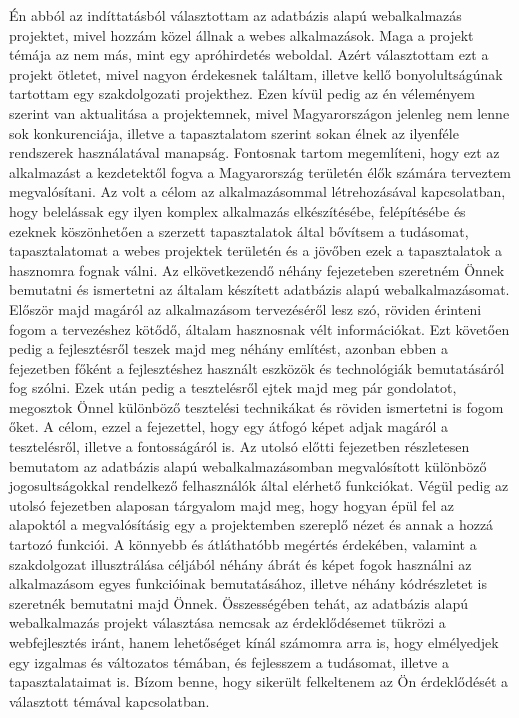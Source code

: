\documentclass[]{thesis-ekf}
\theoremstyle{definition}
\theoremstyle{remark}
\begin{document}
	Én abból az indíttatásból választottam az adatbázis alapú webalkalmazás projektet, mivel hozzám közel állnak a webes alkalmazások. Maga a projekt témája az nem más, mint egy apróhirdetés weboldal. Azért választottam ezt a projekt ötletet, mivel nagyon érdekesnek találtam, illetve kellő bonyolultságúnak tartottam egy szakdolgozati projekthez. Ezen kívül pedig az én véleményem szerint van aktualitása a projektemnek, mivel Magyarországon jelenleg nem lenne sok konkurenciája, illetve a tapasztalatom szerint sokan élnek az ilyenféle rendszerek használatával manapság. Fontosnak tartom megemlíteni, hogy ezt az alkalmazást a kezdetektől fogva a Magyarország területén élők számára terveztem megvalósítani. Az volt a célom az alkalmazásommal létrehozásával kapcsolatban, hogy belelássak egy ilyen komplex alkalmazás elkészítésébe, felépítésébe és ezeknek köszönhetően a szerzett tapasztalatok által bővítsem a tudásomat, tapasztalatomat a webes projektek területén és a jövőben ezek a tapasztalatok a hasznomra fognak válni. Az elkövetkezendő néhány fejezeteben szeretném Önnek bemutatni és ismertetni az általam készített adatbázis alapú webalkalmazásomat. Először majd magáról az alkalmazásom tervezéséről lesz szó, röviden érinteni fogom a tervezéshez kötődő, általam hasznosnak vélt információkat. Ezt követően pedig a fejlesztésről teszek majd meg néhány említést, azonban ebben a fejezetben főként a fejlesztéshez használt eszközök és technológiák bemutatásáról fog szólni. Ezek után pedig a tesztelésről ejtek majd meg pár gondolatot, megosztok Önnel különböző tesztelési technikákat és röviden ismertetni is fogom őket. A célom, ezzel a fejezettel, hogy egy átfogó képet adjak magáról a tesztelésről, illetve a fontosságáról is. Az utolsó előtti fejezetben részletesen bemutatom az adatbázis alapú webalkalmazásomban megvalósított különböző jogosultságokkal rendelkező felhasználók által elérhető funkciókat. Végül pedig az utolsó fejezetben alaposan tárgyalom majd meg, hogy hogyan épül fel az alapoktól a megvalósításig egy a projektemben szereplő nézet és annak a hozzá tartozó funkciói. A könnyebb és átláthatóbb megértés érdekében, valamint a szakdolgozat illusztrálása céljából néhány ábrát és képet fogok használni az alkalmazásom egyes funkcióinak bemutatásához, illetve néhány kódrészletet is szeretnék bemutatni majd Önnek. Összességében tehát, az adatbázis alapú webalkalmazás projekt választása nemcsak az érdeklődésemet tükrözi a webfejlesztés iránt, hanem lehetőséget kínál számomra arra is, hogy elmélyedjek egy izgalmas és változatos témában, és fejlesszem a tudásomat, illetve a tapasztalataimat is. Bízom benne, hogy sikerült felkeltenem az Ön érdeklődését a választott témával kapcsolatban. 
	
\end{document}
